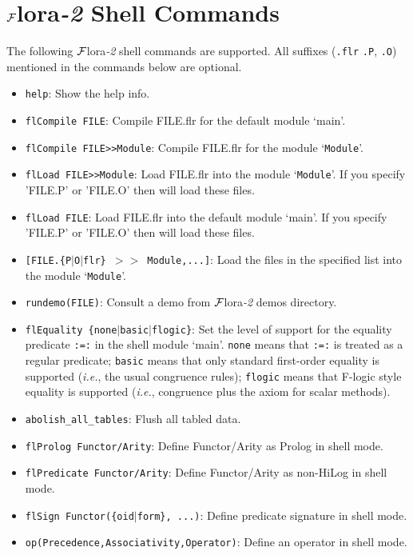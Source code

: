 \documentclass[11pt]{article}
\newcommand{\FLORA}{{\mbox{${\cal F}${\sc lora}\rm\emph{-2}}}\xspace}
\begin{document}
\section{\FLORA Shell Commands} \label{sec-shell-commands}

The following \FLORA shell commands are supported. All suffixes ({\tt .flr}
{\tt .P}, {\tt .O}) mentioned in the commands below are optional.
\begin{itemize}
\item {\tt help}:
    Show the help info.
\item {\tt flCompile FILE}:
    Compile FILE.flr for the default module `main'.
\item {\tt flCompile FILE>>Module}:
    Compile FILE.flr for the module `{\tt Module}'.
\item {\tt flLoad FILE>>Module}:
    Load FILE.flr into the module `{\tt Module}'. If you specify 'FILE.P'
    or 'FILE.O' then will load these files.
\item {\tt flLoad FILE}:
    Load FILE.flr into the default module `main'. If you specify 'FILE.P'
    or 'FILE.O' then will load these files.
\item {\tt [FILE.\{P$|$O$|$flr\} $>>$ Module,...]}:
    Load the files in the specified list into the module `{\tt Module}'.
\item {\tt rundemo(FILE)}:
    Consult a demo from \FLORA demos directory.
\item {\tt flEquality \{none$|$basic$|$flogic\}}:
    Set the level of support for the equality predicate {\tt :=:} in the
    shell module `main'.
    {\tt none}  means that {\tt :=:} is treated as a regular
    predicate; {\tt basic} means that only standard first-order equality is
    supported ({\it i.e.}, the usual congruence rules); {\tt flogic} means
    that F-logic style equality is supported ({\it i.e.}, congruence plus
    the axiom for scalar methods).
\item {\tt abolish\_all\_tables}:
    Flush all tabled data.
\item {\tt flProlog Functor/Arity}:
    Define Functor/Arity as Prolog in shell mode.
\item {\tt flPredicate Functor/Arity}:
    Define Functor/Arity as non-HiLog in shell mode.
\item {\tt flSign Functor(\{oid$|$form\}, ...)}:
    Define predicate signature in shell mode.
\item {\tt op(Precedence,Associativity,Operator)}:
    Define an operator in shell mode.

\end{itemize}
\end{document}
